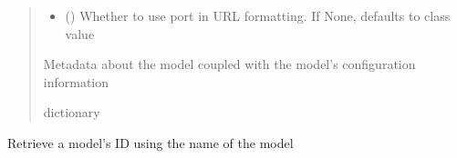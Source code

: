 \documentclass[letterpaper,10pt,english]{sphinxmanual}
\begin{document}
\begin{fulllineitems}
\begin{fulllineitems}
\begin{quote}
\begin{description}
\begin{itemize}
\item {} 
\sphinxAtStartPar
{} (\sphinxstyleliteralemphasis{\sphinxupquote{ (}}\sphinxstyleliteralemphasis{\sphinxupquote{)}}) \textendash{} Whether to use port in URL formatting. If None, defaults to class value

\end{itemize}

\sphinxAtStartPar
{} \textendash{} Metadata about the model coupled with the model’s configuration information

\sphinxAtStartPar
dictionary

\end{description}\end{quote}

\end{fulllineitems}


\begin{fulllineitems}
\label{\detokenize{aisquared.platform:aisquared.platform.AISquaredPlatformClient.AISquaredPlatformClient.get_model_id_by_name}}
\pysigstartsignatures
{}
\pysigstopsignatures
\sphinxAtStartPar
Retrieve a model’s ID using the name of the model


\end{fulllineitems}
\end{fulllineitems}
\end{document}

